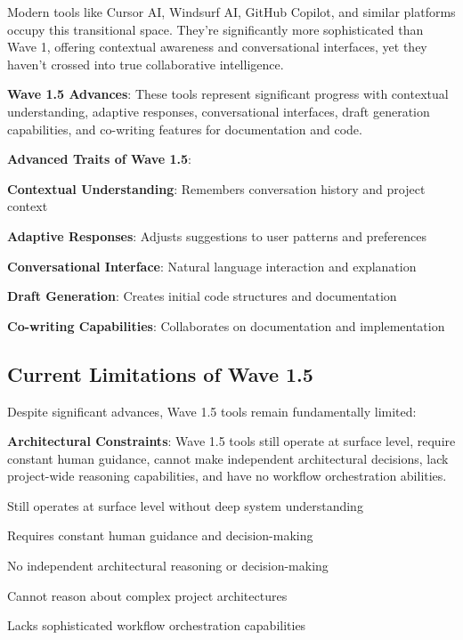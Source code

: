 Modern tools like Cursor AI, Windsurf AI, GitHub Copilot, and similar platforms occupy this transitional space. They're significantly more sophisticated than Wave 1, offering contextual awareness and conversational interfaces, yet they haven't crossed into true collaborative intelligence.

\begin{successbox}
\textbf{Wave 1.5 Advances}: These tools represent significant progress with contextual understanding, adaptive responses, conversational interfaces, draft generation capabilities, and co-writing features for documentation and code.
\end{successbox}

\textbf{Advanced Traits of Wave 1.5}:
\begin{expandedlist}
    \item \textbf{Contextual Understanding}: Remembers conversation history and project context
    \item \textbf{Adaptive Responses}: Adjusts suggestions to user patterns and preferences
    \item \textbf{Conversational Interface}: Natural language interaction and explanation
    \item \textbf{Draft Generation}: Creates initial code structures and documentation
    \item \textbf{Co-writing Capabilities}: Collaborates on documentation and implementation
\end{expandedlist}

\subsection{Current Limitations of Wave 1.5}
\label{subsec:wave-1-5-limitations}

Despite significant advances, Wave 1.5 tools remain fundamentally limited:

\begin{alertbox}
\textbf{Architectural Constraints}: Wave 1.5 tools still operate at surface level, require constant human guidance, cannot make independent architectural decisions, lack project-wide reasoning capabilities, and have no workflow orchestration abilities.
\end{alertbox}

\begin{compactlist}
    \item Still operates at surface level without deep system understanding
    \item Requires constant human guidance and decision-making
    \item No independent architectural reasoning or decision-making
    \item Cannot reason about complex project architectures
    \item Lacks sophisticated workflow orchestration capabilities
\end{compactlist}

